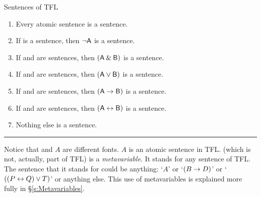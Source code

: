 

\begin{factboxy}{Sentences of TFL}\label{TFLsentences}
	\begin{enumerate}
		\item Every atomic sentence is a sentence.
		\item If  is a sentence, then ${\neg}\mathsf{A}$ is a sentence.
		\item If  and  are sentences, then $(\mathsf{A}\mathbin{\&}\mathsf{B})$ is a sentence.
		\item If  and  are sentences, then $(\mathsf{A}\vee\mathsf{B})$ is a sentence.
		\item If  and  are sentences, then $(\mathsf{A}\rightarrow\mathsf{B})$ is a sentence.
		\item If  and  are sentences, then $(\mathsf{A}\leftrightarrow\mathsf{B})$ is a sentence.
		\item Nothing else is a sentence.
	\end{enumerate}
\hrule
\medskip
\footnotesize{Notice that  and $A$ are different fonts. $A$ is an atomic sentence in TFL.  (which is not, actually, part of TFL) is a \textit{metavariable}. It stands for any sentence of TFL. The sentence that it stands for could be anything: `$A$' or `$(B \rightarrow D)$' or `$((P \leftrightarrow Q) \vee T)$' or anything else. This use of {metavariables} is explained more fully in \S\ref{s:Metavariables}.}
\end{factboxy}


